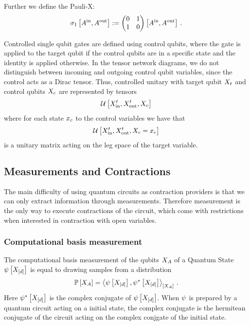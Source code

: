 Further we define the Pauli-X:
\begin{align*}
    \sigma_1\left[A^{\mathrm{in}},A^{\mathrm{out}}\right] :=
    \begin{pmatrix} 
        0 & 1 \\
        1 & 0 \end{pmatrix}\left[A^{\mathrm{in}},A^{\mathrm{out}}\right] \, .
\end{align*}

Controlled single qubit gates are defined using control qubits, where the gate is applied to the target qubit if the control qubits are in a specific state and the identity is applied otherwise.
In the tensor network diagrams, we do not distinguish between incoming and outgoing control qubit variables, since the control acts as a Dirac tensor.
Thus, controlled unitary with target qubit $X_{t}$ and control qubits $X_{c}$ are represented by tensors
\begin{align*}
    \mathcal{U}\left[X_{\mathrm{in}}^{t},X_{\mathrm{out}}^{t},X_{c}\right]
\end{align*}
where for each state $x_{c}$ to the control variables we have that
\begin{align*}
    \mathcal{U}\left[X_{\mathrm{in}}^{t},X_{\mathrm{out}}^{t},X_{c}=x_{c}\right]
\end{align*}
is a unitary matrix acting on the leg space of the target variable.

\subsection{Measurements and Contractions}

The main difficulty of using quantum circuits as contraction providers is that we can only extract information through measurements.
Therefore measurement is the only way to execute contractions of the circuit, which come with restrictions when interested in contraction with open variables.

\subsubsection{Computational basis measurement}

The computational basis measurement of the qubits $X_{A}$ of a Quantum State $\psi\left[X_{[d]}\right]$ is equal to drawing samples from a distribution
\begin{align*}
    \mathbb{P}\left[X_{A}\right] = \left\langle 
        \psi\left[X_{[d]}\right], \psi^{*}\left[X_{[d]}\right]
    \right\rangle_{\left[ X_{A} \right]} \, .
\end{align*}
Here $\psi^{*}\left[X_{[d]}\right]$ is the complex conjugate of $\psi\left[X_{[d]}\right]$.
When $\psi$ is prepared by a quantum circuit acting on a initial state, the complex conjugate is the hermitean conjugate of the circuit acting on the complex conjgate of the initial state.

